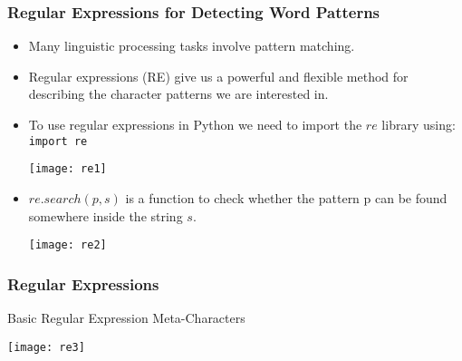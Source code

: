 \begin{frame}[fragile]
\frametitle{ Regular Expressions for Detecting Word Patterns }
\begin{itemize}
\item Many linguistic processing tasks involve pattern matching. 
\item Regular expressions (RE) give us a powerful and flexible method for describing the character patterns we are interested in.
\item To use regular expressions in Python we need to import the $re$ library using: \lstinline|import re|

\begin{center}
\texttt{[image: re1]}
\end{center}
\item $re.search(p,s)$ is a function to check whether the pattern p can be found somewhere inside the string $s$. 
\begin{center}
\texttt{[image: re2]}
\end{center}
\end{itemize}
\end{frame}



\begin{frame}[fragile]
\frametitle{Regular Expressions}
Basic Regular Expression Meta-Characters 
\begin{center}
\texttt{[image: re3]}
\end{center}
\end{frame}


